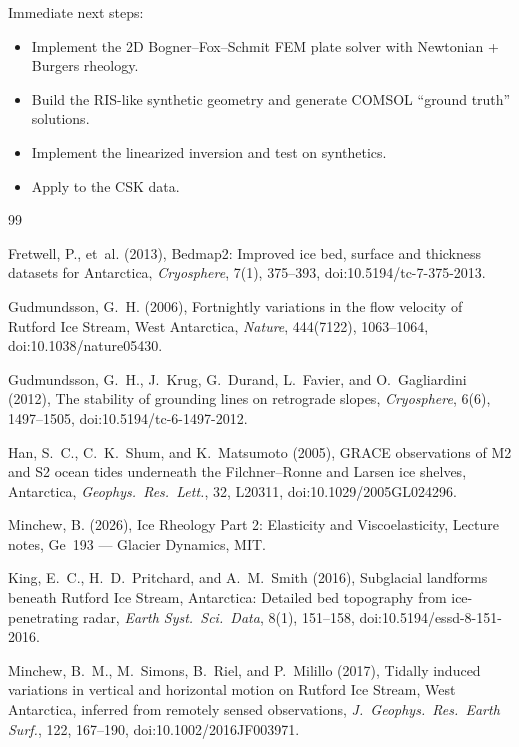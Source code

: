 \documentclass[11pt,letterpaper]{article}
\begin{document}
Immediate next steps:
\begin{itemize}
  \item Implement the 2D Bogner--Fox--Schmit FEM plate solver with Newtonian + Burgers rheology.
  \item Build the RIS-like synthetic geometry and generate COMSOL ``ground truth'' solutions.
  \item Implement the linearized inversion and test on synthetics.
  \item Apply to the \citet{Minchew2017} CSK data.
\end{itemize}


\begin{thebibliography}{99}

Fretwell, P., et~al. (2013),
Bedmap2: Improved ice bed, surface and thickness datasets for Antarctica,
\textit{Cryosphere}, 7(1), 375--393, doi:10.5194/tc-7-375-2013.

Gudmundsson, G.~H. (2006),
Fortnightly variations in the flow velocity of {R}utford {I}ce {S}tream, {W}est {A}ntarctica,
\textit{Nature}, 444(7122), 1063--1064, doi:10.1038/nature05430.

Gudmundsson, G.~H., J.~Krug, G.~Durand, L.~Favier, and O.~Gagliardini (2012),
The stability of grounding lines on retrograde slopes,
\textit{Cryosphere}, 6(6), 1497--1505, doi:10.5194/tc-6-1497-2012.

Han, S.~C., C.~K.~Shum, and K.~Matsumoto (2005),
{GRACE} observations of {M2} and {S2} ocean tides underneath the {F}ilchner--{R}onne and {L}arsen ice shelves, {A}ntarctica,
\textit{Geophys.\ Res.\ Lett.}, 32, L20311, doi:10.1029/2005GL024296.

Minchew, B. (2026),
Ice Rheology Part 2: Elasticity and Viscoelasticity,
Lecture notes, Ge~193 --- Glacier Dynamics, MIT.

King, E.~C., H.~D.~Pritchard, and A.~M.~Smith (2016),
Subglacial landforms beneath {R}utford {I}ce {S}tream, {A}ntarctica: Detailed bed topography from ice-penetrating radar,
\textit{Earth Syst.\ Sci.\ Data}, 8(1), 151--158, doi:10.5194/essd-8-151-2016.

Minchew, B.~M., M.~Simons, B.~Riel, and P.~Milillo (2017),
Tidally induced variations in vertical and horizontal motion on {R}utford {I}ce {S}tream, {W}est {A}ntarctica, inferred from remotely sensed observations,
\textit{J.\ Geophys.\ Res.\ Earth Surf.}, 122, 167--190, doi:10.1002/2016JF003971.


\end{thebibliography}
\end{document}
